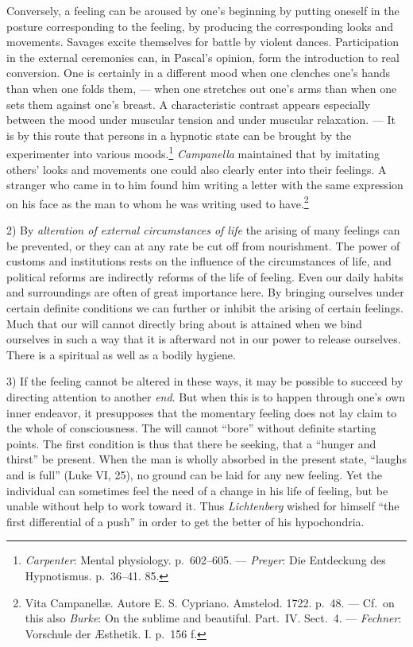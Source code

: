 \documentclass[12pt,a4paper]{book}
\newcommand{\opage}[1]{\marginnote{\footnotesize\textit{[#1]}}}
\begin{document}
Conversely, a feeling can be aroused by one's beginning by putting
oneself in the posture corresponding to the feeling, by producing the
corresponding looks and movements. Savages excite themselves for battle
by violent dances. Participation in the external ceremonies can, in
Pascal's opinion, form the introduction to real conversion. One is
certainly in a different mood when one clenches one's hands than when one
folds them, --- when one stretches out one's arms than when one sets them
against one's breast. A characteristic contrast appears especially
between the mood under muscular tension and under muscular relaxation.
--- It is by this route that persons in a hypnotic state can be brought
by the experimenter into various moods.\footnote{\emph{Carpenter}: Mental
physiology. p.~602--605. --- \emph{Preyer}: Die Entdeckung des
Hypnotismus. p.~36--41. 85.} \emph{Campanella} maintained that by
imitating others' looks and movements one could also clearly enter into
their feelings. A stranger who came in to him found him writing a letter
with the same expression on his face as the man to whom he
was writing used to have.\footnote{Vita Campanellæ. Autore E. S.
Cypriano. Amstelod. 1722. p.~48. --- Cf.\ on this also \emph{Burke}: On
the sublime and beautiful. Part.\ IV. Sect.~4. --- \emph{Fechner}:
Vorschule der Æsthetik. I. p.~156 f.}

2) By \emph{alteration of external circumstances of life} the arising of
many feelings can be prevented, or they can at any rate be cut off from
nourishment. The power of customs and institutions rests on the influence
of the circumstances of life, and political reforms are indirectly
reforms of the life of feeling. Even our daily habits and surroundings
are often of great importance here. By bringing ourselves under certain
definite conditions we can further or inhibit the arising of certain
feelings. Much that our will cannot directly bring about is attained when
we bind ourselves in such a way that it is afterward not in our power to
release ourselves. There is a spiritual as well as a bodily hygiene.

\opage{389}3) If the feeling cannot be altered in these ways, it may be
possible to succeed by directing attention to another \emph{end}. But when
this is to happen through one's own inner endeavor, it presupposes that
the momentary feeling does not lay claim to the whole of consciousness.
The will cannot ``bore'' without definite starting points. The first
condition is thus that there be seeking, that a ``hunger and thirst'' be
present. When the man is wholly absorbed in the present state, ``laughs
and is full'' (Luke VI, 25), no ground can be laid for any new feeling.
Yet the individual can sometimes feel the need of a change in his life of
feeling, but be unable without help to work toward it. Thus
\emph{Lichtenberg} wished for himself ``the first differential of a
push'' in order to get the better of his hypochondria.
\end{document}
